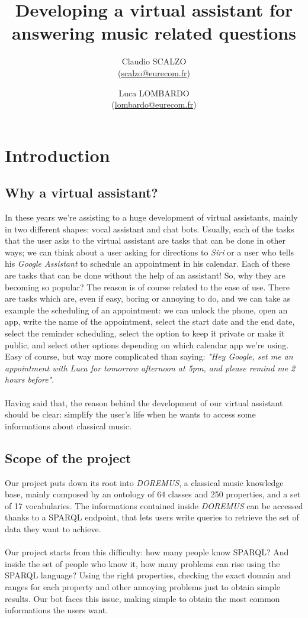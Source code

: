 \documentclass[a4paper,12pt]{report}
\title{Developing a virtual assistant for answering music related questions}
\author{Claudio SCALZO \\ (\href{mailto:scalzo@eurecom.fr}{scalzo@eurecom.fr}) \and Luca LOMBARDO \\ (\href{mailto:lombardo@eurecom.fr}{lombardo@eurecom.fr}) }
\begin{document}
\maketitle
\tableofcontents

\chapter{Introduction}
	\section{Why a virtual assistant?}
	In these years we're assisting to a huge development of virtual assistants, mainly in two different shapes: vocal assistant and chat bots. Usually, each of the tasks that the user asks to the virtual assistant are tasks that can be done in other ways; we can think about a user asking for directions to \textit{Siri} or a user who tells his \textit{Google Assistant} to schedule an appointment in his calendar. Each of these are tasks that can be done without the help of an assistant! So, why they are becoming so popular? The reason is of course related to the ease of use. There are tasks which are, even if easy, boring or annoying to do, and we can take as example the scheduling of an appointment: we can unlock the phone, open an app, write the name of the appointment, select the start date and the end date, select the reminder scheduling, select the option to keep it private or make it public, and select other options depending on which calendar app we're using. Easy of course, but way more complicated than saying: \textit{"Hey Google, set me an appointment with Luca for tomorrow afternoon at 5pm, and please remind me 2 hours before"}.\\\\
	Having said that, the reason behind the development of our virtual assistant should be clear: simplify the user's life when he wants to access some informations about classical music.
	
	\section{Scope of the project}
	Our project puts down its root into \textit{DOREMUS}\cite{doremus}, a classical music knowledge base, mainly composed by an ontology of 64 classes and 250 properties, and a set of 17 vocabularies. The informations contained inside \textit{DOREMUS} can be accessed thanks to a SPARQL endpoint, that lets users write queries to retrieve the set of data they want to achieve.\\\\
	Our project starts from this difficulty: how many people know SPARQL? And inside the set of people who know it, how many problems can rise using the SPARQL language? Using the right properties, checking the exact domain and ranges for each property and other annoying problems just to obtain simple results. Our bot faces this issue, making simple to obtain the most common informations the users want.
	
\end{document}
